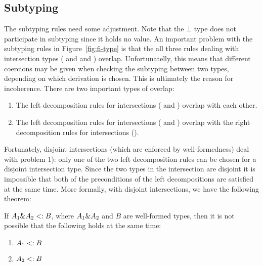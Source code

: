 \subsection{Subtyping}


The subtyping rules need some adjustment.
Note that the $\bot$ type does not participate in subtyping since it holds no value.
An important
problem with the subtyping rules in Figure~\ref{fig:fi-type} is that the all three rules
dealing with intersection types
( and  and )
overlap. Unfortunatelly,
this means that different coercions may be given when checking the subtyping
between two types, depending on which derivation is chosen. This is ultimately the reason
for incoherence.
There are two important types of overlap:

\begin{enumerate}

\item The left decomposition rules for intersections ( and ) overlap with each other.

\item The left decomposition rules for intersections ( and )
overlap with the right decomposition rules for intersections ().

\end{enumerate}

\noindent Fortunately, disjoint intersections (which are enforced by well-formedness)
deal with problem 1): only one of the two left decomposition rules
can be chosen for a disjoint intersection type. Since the two types in the intersection
are disjoint it is impossible that both of the preconditions of the left decompositions are satisfied
at the same time. More formally, with disjoint intersections, we have the following theorem:

\begin{lemma}
  \label{lemma:unique-subtype-contributor}

  If $A_1 \& A_2 <: B$, where $A_1 \& A_2$ and $B$ are well-formed types,
  then it is not possible that the following holds at the same time:
  \begin{enumerate}
    \item $A_1 <: B$
    \item $A_2 <: B$
  \end{enumerate}
\end{lemma}

